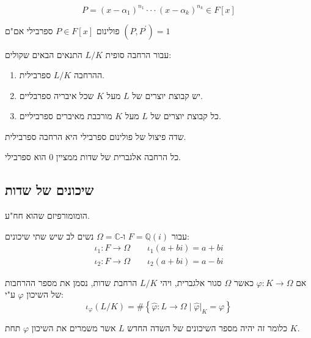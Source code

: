 \documentclass{tstextbook}
\begin{document}
\begin{corollary}
$$P=(x-\alpha_{1})^{n_{1}}\cdot\cdot\cdot(x-\alpha_{k})^{n_{k}}\in F[x]$$

\end{corollary}
\begin{proposition}
פולינום \(P \in F[x]\) ספרבילי אם"ם \((P,P^{\prime})=1\)

\end{proposition}
\begin{proposition}
עבור הרחבה סופית \(L / K\) התנאים הבאים שקולים:

  \begin{enumerate}
    \item ההרחבה \(L / K\) ספרבילית. 


    \item יש קבוצת יוצרים של \(L\) מעל \(K\) שכל איבריה ספרבליים. 


    \item כל קבוצת יוצרים של \(L\) מעל \(K\) מורכבת מאיברים ספרביליים. 


  \end{enumerate}
\end{proposition}
\begin{corollary}
שדה פיצול של פולינום ספרבילי היא הרחבה ספרבילית.

\end{corollary}
\begin{proposition}
כל הרחבה אלגברית של שדות ממציין 0 הוא ספרבילי.

\end{proposition}
\subsection{שיכונים של שדות}

\begin{definition}
הומומורפיזם שהוא חח"ע.

\end{definition}
\begin{example}
עבור \(F=\mathbb{Q}(i)\) ו-\(\Omega=\mathbb{C}\) נשים לב שיש שתי שיכונים:
$$\begin{gather}\iota_{1}:F\to \Omega \qquad \iota_{1}(a+bi)=a+bi  \\\iota_{2}:F\to \Omega \qquad \iota_{2}(a+bi)=a-bi
\end{gather}$$

\end{example}
\begin{definition}
אם \(\varphi :K\to \Omega\) כאשר \(\Omega\) סגור אלגברית, ויהי \(L / K\) הרחבת שדות, נסמן את מספר ההרחבות של השיכון \(\varphi\) ע"י:
$$\iota _{\varphi}( L / K) = \#\left\{  \widehat{\varphi}:L\to \Omega \mid \widehat{\varphi}|_{K}=\varphi  \right\}$$

\end{definition}
כלומר זה יהיה מספר השיכונים של השדה החדש \(L\) אשר משמרים את השיכון \(\varphi\) תחת \(K\).
\end{document}
